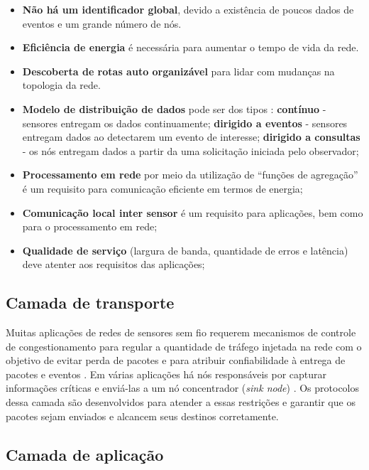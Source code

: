  \begin{itemize}
 \item \textbf{Não há um identificador global}, devido a existência de poucos dados de eventos e um grande número de nós.
 \item \textbf{Eficiência de energia} é necessária para aumentar o tempo de vida da rede.
 \item \textbf{Descoberta de rotas auto organizável} para lidar com mudanças na topologia da rede.
 \item \textbf{Modelo de distribuição de dados} pode ser dos tipos \cite{Tilak02ataxonomy}:
 \subitem \textbf{contínuo} - sensores entregam os dados continuamente;
 \subitem \textbf{dirigido a eventos} - sensores entregam dados ao detectarem um evento de interesse;
 \subitem \textbf{dirigido a consultas} - os nós entregam dados a partir da uma solicitação iniciada pelo observador;
 \item \textbf{Processamento em rede} por meio da utilização de ``funções de agregação'' é um requisito para comunicação eficiente em termos de energia;
 \item \textbf{Comunicação local inter sensor} é um requisito para aplicações, bem como para o processamento em rede;
 \item \textbf{Qualidade de serviço} (largura de banda, quantidade de erros e latência) deve atenter aos requisitos das aplicações; 
 
 \end{itemize}

 \subsection{Camada de transporte} 
 
 Muitas aplicações de redes de sensores sem fio requerem mecanismos de controle de congestionamento para regular a quantidade de tráfego injetada na rede com o objetivo de evitar perda de pacotes e para atribuir confiabilidade à entrega de pacotes e eventos \cite{RaSaGu2008-InCol}. Em várias aplicações há nós responsáveis por capturar informações críticas e enviá-las a um nó concentrador (\textit{sink node}) \cite{RaSaGu2008-InCol}. Os protocolos dessa camada são desenvolvidos para atender a essas restrições e garantir que os pacotes sejam enviados e alcancem seus destinos corretamente.

 \subsection{Camada de aplicação}
 

